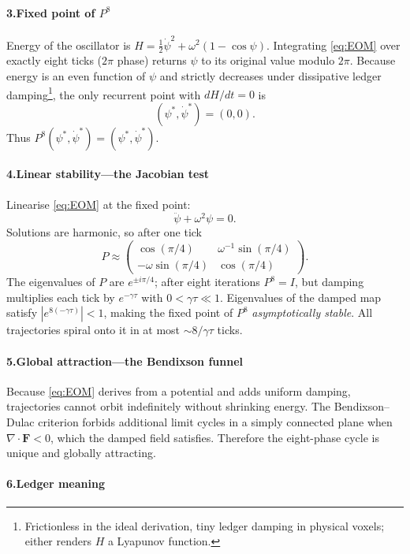 \documentclass[11pt,oneside]{book}
\begin{document}
\paragraph*{3.\quad Fixed point of \boldmath$P^{8}$}

Energy of the oscillator is
\(
H=\tfrac12\dot\psi^{2}+\omega^{2}(1-\cos\psi).
\)
Integrating \eqref{eq:EOM} over exactly eight ticks ($2\pi$ phase) returns $\psi$ to its original value modulo $2\pi$.  
Because energy is an even function of $\psi$ and strictly decreases under dissipative ledger damping\footnote{Frictionless in the ideal derivation, tiny ledger damping in physical voxels; either renders $H$ a Lyapunov function.}, the only recurrent point with $dH/dt=0$ is
\[
(\psi^{*},\dot\psi^{*}) = (0,0).
\]
Thus $P^{8}(\psi^{*},\dot\psi^{*})=(\psi^{*},\dot\psi^{*})$.

\paragraph*{4.\quad Linear stability—the Jacobian test}

Linearise \eqref{eq:EOM} at the fixed point:
\[
\ddot\psi + \omega^{2}\psi = 0.
\]
Solutions are harmonic, so after one tick
\[
P \approx
\begin{pmatrix}
\cos(\pi/4) & \omega^{-1}\sin(\pi/4) \\
-\omega\sin(\pi/4) & \cos(\pi/4)
\end{pmatrix}.
\]
The eigenvalues of $P$ are $e^{\pm i\pi/4}$; after eight iterations
$P^{8} = I$, but damping multiplies each tick by $e^{-\gamma\tau}$ with
$0<\gamma\tau\ll1$.  
Eigenvalues of the damped map satisfy $|e^{8(-\gamma\tau)}|<1$, making
the fixed point of $P^{8}$ \emph{asymptotically stable}.  
All trajectories spiral onto it in at most $\sim 8/\gamma\tau$ ticks.

\paragraph*{5.\quad Global attraction—the Bendixson funnel}

Because \eqref{eq:EOM} derives from a potential and adds uniform
damping, trajectories cannot orbit indefinitely without shrinking
energy.  The Bendixson–Dulac criterion forbids additional limit cycles
in a simply connected plane when $\nabla\!\cdot\!\mathbf F<0$, which the
damped field satisfies.  Therefore the eight-phase cycle is unique and
globally attracting.

\paragraph*{6.\quad Ledger meaning}
\end{document}
